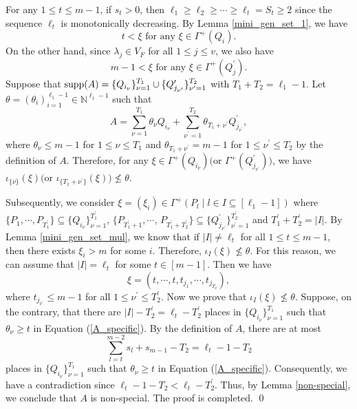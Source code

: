 \documentclass[journal,12pt,onecolumn]{IEEEtran}
\begin{document}
    For any $1\le t\le m-1$, if $s_t>0$, then $\ell_1\ge \ell_2\ge\cdots\ge \ell_t=S_t\ge2$ since the sequence $\ell_t$ is monotonically decreasing. By Lemma \ref{mini_gen_set_1}, we have
    \[
        t<\xi\text{ for any }\xi\in\Gamma^+(Q_{i}).
    \]
    On the other hand, since $\lambda_j\in V_F$ for all $1\le j\le v$, we also have 
    \[
        m-1 < \xi\text{ for any }\xi\in\Gamma^+(Q_{j}^\prime).
    \]
    Suppose that ${\rm supp}(A)=\{Q_{i_\nu}\}_{\nu=1}^{T_1}\cup\{Q_{j_{\nu^\prime}}^\prime\}_{\nu^\prime=1}^{T_2} $ with $T_1+T_2=\ell_1-1$. Let $\theta = (\theta_i)_{i=1}^{\ell_1-1}\in\mathbb{N}^{\ell_1-1}$ such that 
    \begin{equation}\label{A_specific}
        A=\sum_{\nu=1}^{T_1}\theta_\nu Q_{i_\nu}+\sum_{\nu^\prime=1}^{T_2}\theta_{T_1+\nu^\prime}Q_{j_{\nu^\prime}}^\prime,
    \end{equation}
    where $\theta_\nu\le m-1$ for $1\le \nu\le T_1$ and $\theta_{T_1+\nu^\prime}=m-1$ for $1\le \nu^\prime\le T_2$ by the definition of $A$. Therefore, for any $\xi \in \Gamma^+(Q_{i_\nu})\big(\text{or }\Gamma^+(Q_{j_{\nu^\prime}}^\prime)\big)$, we have $\iota_{\{\nu\}}(\xi)\big(\text{or }\iota_{\{T_1+\nu^\prime\}}(\xi)\big)\nleq \theta$. 

    Subsequently, we consider $\xi=(\xi_i)\in\Gamma^+(P_l\mid l\in I\subseteq [\ell_1-1])$ where $\{P_1,\cdots,P_{T_1^\prime}\}\subseteq\{Q_{i_\nu}\}_{\nu=1}^{T_1^\prime}$, $\{P_{T_1^\prime+1},\cdots$, $P_{T_1^\prime+T_2^\prime}\}\subseteq\{Q_{j_{\nu^\prime}}^\prime\}_{\nu^\prime=1}^{T_2^\prime}$ and $T_1^\prime+T_2^\prime=|I|$. By Lemma \ref{mini_gen_set_mul}, we know that if $|I|\neq \ell_t$ for all $1\le t\le m-1$, then there exists $\xi_i>m$ for some $i$. Therefore, $\iota_I(\xi)\nleq \theta$. For this reason, we can assume that $|I|= \ell_t$ for some $t\in[m-1]$. Then we have
    \[
        \xi = (t,\cdots,t,t_{j_1},\cdots,t_{j_{T_2^\prime}}),
    \]
    where $t_{j_{\nu^\prime}}\le m-1$ for all $1\le \nu^\prime\le T_2^\prime$. Now we prove that $\iota_I(\xi)\nleq \theta$. Suppose, on the contrary, that there are $|I|-T_2^\prime=\ell_t-T_2^\prime$ places in $\{Q_{i_\nu}\}_{\nu=1}^{T_1}$ such that $\theta_\nu\ge t$ in Equation (\ref{A_specific}). By the definition of $A$, there are at most
    \[
        \sum_{l=t}^{m-2}s_l+s_{m-1}-T_2=\ell_t-1-T_2
    \]
    places in $\{Q_{i_\nu}\}_{\nu=1}^{T_1}$ such that $\theta_\nu\ge t$ in Equation (\ref{A_specific}). Consequently, we have a contradiction since $\ell_t - 1 - T_2 < \ell_t - T_2^\prime$. Thus, by Lemma \ref{non-special}, we conclude that $A$ is non-special. The proof is completed.  \qed
\end{document}
